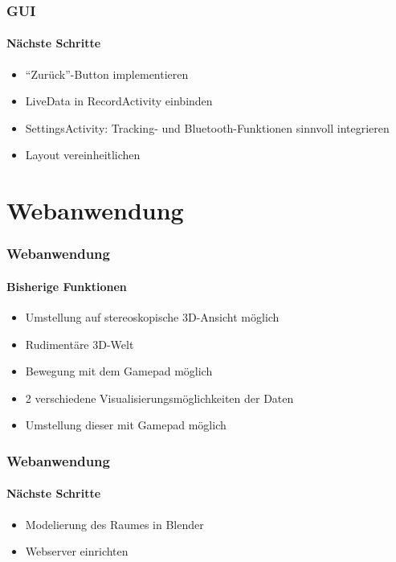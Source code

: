 \documentclass{beamer}
\begin{document}
\begin{frame}
\frametitle{GUI}
\framesubtitle{N\"achste Schritte}
\begin{itemize}
  \item ``Zur\"uck''-Button implementieren
  \item LiveData in RecordActivity einbinden
  \item SettingsActivity: Tracking- und Bluetooth-Funktionen sinnvoll integrieren
  \item Layout vereinheitlichen
\end{itemize}
\end{frame}

\section{Webanwendung}

\begin{frame}
\frametitle{Webanwendung}
\framesubtitle{Bisherige Funktionen}
\begin{itemize}
  \item Umstellung auf stereoskopische 3D-Ansicht m\"oglich
  \item Rudiment\"are 3D-Welt
  \item Bewegung mit dem Gamepad m\"oglich
  \item 2 verschiedene Visualisierungsm\"oglichkeiten der Daten
  \item Umstellung dieser mit Gamepad m\"oglich
\end{itemize}
\end{frame}

\begin{frame}
\frametitle{Webanwendung}
\framesubtitle{N\"achste Schritte}
\begin{itemize}
  \item Modelierung des Raumes in Blender
  \item Webserver einrichten
\end{itemize}
\end{frame}
\end{document}
